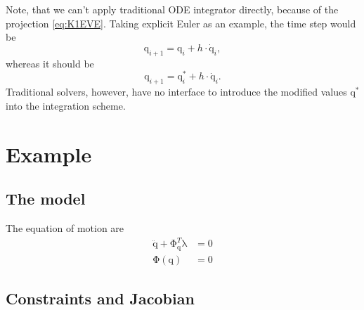 \documentclass{scrartcl}
\newcommand\mMat[1]{\ensuremath{\boldsymbol{\mathrm{#1}}}}
\newcommand\mVec[1]{\ensuremath{\boldsymbol{\mathrm{#1}}}}
\newcommand\mOf[1]{\left({#1}\right)}
\begin{document}
Note, that we can't apply traditional ODE integrator directly, because of the
projection \eqref{eq:K1EVE}. Taking explicit Euler as an example, the time step
would be
\begin{equation}
  \mVec{q}_{i+1} = \mVec{q}_i + h \cdot \mVec{\dot q}_i,
\end{equation}
whereas it should be
\begin{equation}
  \mVec{q}_{i+1} = \mVec{q}_i^{*} + h \cdot \mVec{\dot q}_i.
\end{equation}
Traditional solvers, however, have no interface to introduce the modified
values $\mVec{q}^{*}$ into the integration scheme.

\section{Example}

\subsection{The model}

The equation of motion are
\begin{subequations}
\label{eq:6HKMG}
\begin{align}
  \label{eq:X83SF}
  \mVec{\ddot q} + \mMat{\Phi}_{\mVec{q}}^T \mVec{\lambda} &= \mVec{0}
  \\
  \label{eq:HVFIS}
  \mVec{\Phi}\mOf{\mVec{q}} &= \mVec{0}
\end{align}
\end{subequations}

\subsection{Constraints and Jacobian}
\end{document}
